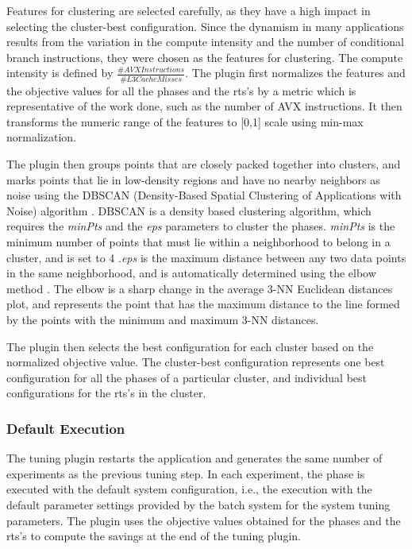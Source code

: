 Features for clustering are selected carefully, as they have a high impact in selecting the cluster-best configuration. Since the dynamism in many applications results from the variation in the compute intensity and the number of conditional branch instructions, they were chosen as the features for clustering. The compute intensity is defined by $\frac{\#AVX Instructions}{\#L3 Cache Misses}$. The plugin first normalizes the features and the objective values for all the phases and the rts’s by a metric which is representative of the work done, such as the number of AVX instructions. It then transforms the numeric range of the features to [0,1] scale using min-max normalization.

The plugin then groups points that are closely packed together into clusters, and marks points that lie in low-density regions and have no nearby neighbors as noise using the DBSCAN (Density-Based Spatial Clustering of Applications with Noise) algorithm . DBSCAN is a density based clustering algorithm, which requires the \textit{minPts} and the \textit{eps} parameters to cluster the phases. \textit{minPts} is the minimum number of points that must lie within a neighborhood to belong in a cluster, and is set to 4 .\textit{eps} is the maximum distance between any two data points in the same neighborhood, and is automatically determined using the elbow method . The elbow is a sharp change in the average 3-NN Euclidean distances plot, and represents the point that has the maximum distance to the line formed by the points with the minimum and maximum 3-NN distances.

The plugin then selects the best configuration for each cluster based on the normalized objective value. The cluster-best configuration represents one best configuration for all the phases of a particular cluster, and individual best configurations for the rts's in the cluster.

\subsubsection{Default Execution} \label{default-execution} 
The tuning plugin restarts the application and generates the same number of experiments as the previous tuning step. In each experiment, the phase is executed with the default system configuration, i.e., the execution with the default parameter settings provided by the batch system for the system tuning parameters. The plugin uses the objective values obtained for the phases and the rts’s to compute the savings at the end of the tuning plugin.

